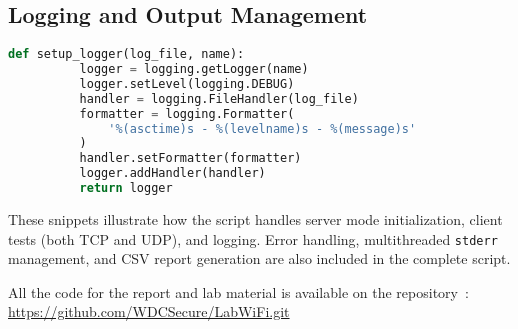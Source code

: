     \subsection*{Logging and Output Management}

        \begin{lstlisting}[language=Python, caption={Excerpt for logging setup.}]
      def setup_logger(log_file, name):
          logger = logging.getLogger(name)
          logger.setLevel(logging.DEBUG)
          handler = logging.FileHandler(log_file)
          formatter = logging.Formatter(
              '%(asctime)s - %(levelname)s - %(message)s'
          )
          handler.setFormatter(formatter)
          logger.addHandler(handler)
          return logger
        \end{lstlisting}

    \noindent These snippets illustrate how the script handles server mode initialization, client tests (both TCP and UDP), and logging. 
    Error handling, multithreaded \texttt{stderr} management, and CSV report generation are also included in the complete script.
    
    \noindent All the code for the report and lab material is available on the repository~\cite{LabWiFiRepo}: \url{https://github.com/WDCSecure/LabWiFi.git}
